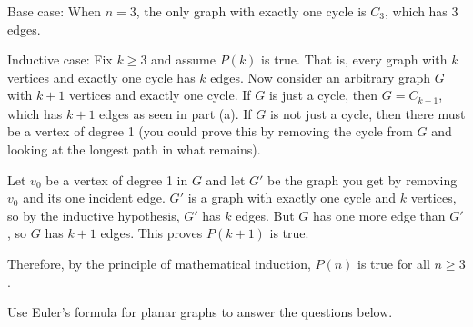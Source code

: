 \documentclass[10pt]{exam}
\begin{document}
\begin{questions}
\begin{parts}
\begin{solution}
      Base case: When $n = 3$, the only graph with exactly one cycle is $C_3$, which has 3 edges.
      
      Inductive case: Fix $k \ge 3$ and assume $P(k)$ is true.  That is, every graph with $k$ vertices and exactly one cycle has $k$ edges.  Now consider an arbitrary graph $G$ with $k+1$ vertices and exactly one cycle.  If $G$ is just a cycle, then $G = C_{k+1}$, which has $k+1$ edges as seen in part (a).  If $G$ is not just a cycle, then there must be a vertex of degree 1 (you could prove this by removing the cycle from $G$ and looking at the longest path in what remains).  
      
      Let $v_0$ be a vertex of degree 1 in $G$ and let $G'$ be the graph you get by removing $v_0$ and its one incident edge.  $G'$ is a graph with exactly one cycle and $k$ vertices, so by the inductive hypothesis, $G'$ has $k$ edges.  But $G$ has one more edge than $G'$, so $G$ has $k+1$ edges.  This proves $P(k+1)$ is true.
      
      Therefore, by the principle of mathematical induction, $P(n)$ is true for all $n \ge 3$.
    \end{solution}
  \end{parts}


  \question[6] Use Euler's formula for planar graphs to answer the questions below.
\end{questions}
\end{document}
